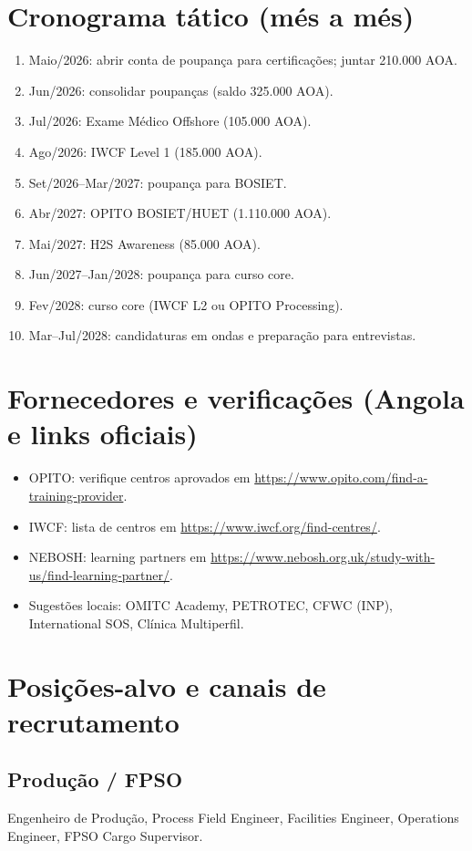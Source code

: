 \documentclass[11pt,openany]{book}
\begin{document}
\section{Cronograma t\'atico (m\'es a m\'es)}
\begin{enumerate}
  \item Maio/2026: abrir conta de poupan\c{c}a para certifica\c{c}\~oes; juntar 210.000 AOA.
  \item Jun/2026: consolidar poupan\c{c}as (saldo 325.000 AOA).
  \item Jul/2026: Exame M\'edico Offshore (105.000 AOA).
  \item Ago/2026: IWCF Level 1 (185.000 AOA).
  \item Set/2026--Mar/2027: poupan\c{c}a para BOSIET.
  \item Abr/2027: OPITO BOSIET/HUET (1.110.000 AOA).
  \item Mai/2027: H2S Awareness (85.000 AOA).
  \item Jun/2027--Jan/2028: poupan\c{c}a para curso core.
  \item Fev/2028: curso core (IWCF L2 ou OPITO Processing).
  \item Mar--Jul/2028: candidaturas em ondas e prepara\c{c}\~ao para entrevistas.
\end{enumerate}

\section{Fornecedores e verifica\c{c}\~oes (Angola e links oficiais)}
\begin{itemize}
  \item OPITO: verifique centros aprovados em \url{https://www.opito.com/find-a-training-provider}.
  \item IWCF: lista de centros em \url{https://www.iwcf.org/find-centres/}.
  \item NEBOSH: learning partners em \url{https://www.nebosh.org.uk/study-with-us/find-learning-partner/}.
  \item Sugest\~oes locais: OMITC Academy, PETROTEC, CFWC (INP), International SOS, Cl\'inica Multiperfil.
\end{itemize}

\section{Posi\c{c}\~oes-alvo e canais de recrutamento}
\subsection{Produ\c{c}\~ao / FPSO}
Engenheiro de Produ\c{c}\~ao, Process Field Engineer, Facilities Engineer, Operations Engineer, FPSO Cargo Supervisor.
\end{document}
